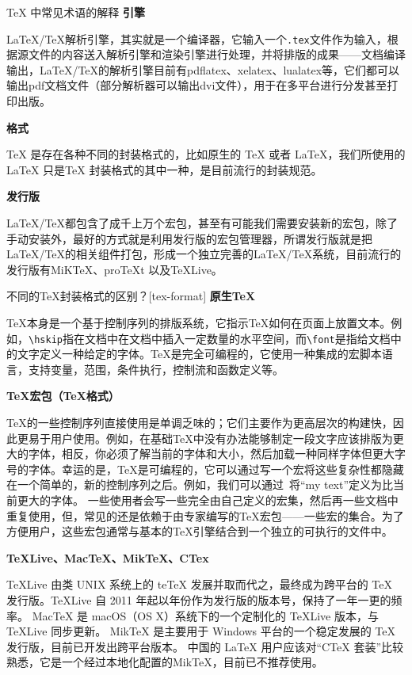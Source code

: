 \begin{faq}{\TeX{} 中常见术语的解释}
  \textbf{引擎}
    
  \LaTeX/\TeX{}解析引擎，其实就是一个编译器，它输入一个\verb|.tex|文件作为输入，根据源文件的内容送入解析引擎和渲染引擎进行处理，并将排版的成果——文档编译输出，\LaTeX/\TeX{}的解析引擎目前有pdflatex、xelatex、lualatex等，它们都可以输出pdf文档文件（部分解析器可以输出dvi文件），用于在多平台进行分发甚至打印出版。
  
  \textbf{格式}
  
  \TeX{} 是存在各种不同的封装格式的，比如原生的 \TeX{} 或者 \LaTeX{}，我们所使用的 \LaTeX{} 只是\TeX{} 封装格式的其中一种，是目前流行的封装规范。
  
  \textbf{发行版}
  
  \LaTeX/\TeX{}都包含了成千上万个宏包，甚至有可能我们需要安装新的宏包，除了手动安装外，最好的方式就是利用发行版的宏包管理器，所谓发行版就是把\LaTeX/\TeX{}的相关组件打包，形成一个独立完善的\LaTeX/\TeX{}系统，目前流行的发行版有MiKTeX、proTeXt 以及TeXLive。
\end{faq}


\begin{faq}{不同的TeX封装格式的区别？}[tex-format]
  \textbf{原生\TeX{}}
  
  TeX本身是一个基于控制序列的排版系统，它指示TeX如何在页面上放置文本。例如，\verb|\hskip|指在文档中在文档中插入一定数量的水平空间，而\verb|\font|是指给文档中的文字定义一种给定的字体。TeX是完全可编程的，它使用一种集成的宏脚本语言，支持变量，范围，条件执行，控制流和函数定义等。
  
  \textbf{TeX宏包（\TeX{}格式）}
  
  TeX的一些控制序列直接使用是单调乏味的；它们主要作为更高层次的构建快，因此更易于用户使用。例如，在基础TeX中没有办法能够制定一段文字应该排版为更大的字体，相反，你必须了解当前的字体和大小，然后加载一种同样字体但更大字号的字体。幸运的是，TeX是可编程的，它可以通过写一个宏将这些复杂性都隐藏在一个简单的，新的控制序列之后。例如，我们可以通过 \texttt{}将“my text”定义为比当前更大的字体。
  一些使用者会写一些完全由自己定义的宏集，然后再一些文档中重复使用，但，常见的还是依赖于由专家编写的TeX宏包——一些宏的集合。为了方便用户，这些宏包通常与基本的TeX引擎结合到一个独立的可执行的文件中。
  
  \textbf{TeXLive、MacTeX、MikTeX、CTex}
  
  TeXLive 由类 UNIX 系统上的 teTeX 发展并取而代之，最终成为跨平台的 TeX 发行版。TeXLive 自 2011 年起以年份作为发行版的版本号，保持了一年一更的频率。
  MacTeX 是 macOS（OS X）系统下的一个定制化的 TeXLive 版本，与 TeXLive 同步更新。
  MikTeX 是主要用于 Windows 平台的一个稳定发展的 TeX 发行版，目前已开发出跨平台版本。
  中国的 LaTeX 用户应该对“CTeX 套装”比较熟悉，它是一个经过本地化配置的MikTeX，目前已不推荐使用。

\end{faq}

